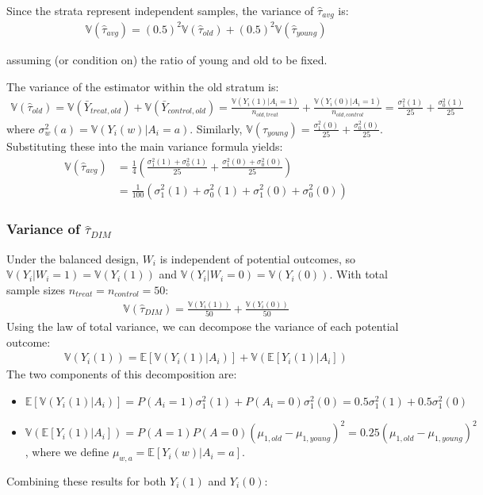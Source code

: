 \documentclass[11pt]{article}
\numberwithin{equation}{section}
\newcommand{\E}{\mathbb{E}}
\newcommand{\Var}{\mathbb{V}}
\begin{document}
Since the strata represent independent samples, the variance of $\hat{\tau}_{avg}$ is:
\begin{align}
\Var(\hat{\tau}_{avg}) = (0.5)^2 \Var(\hat{\tau}_{old}) + (0.5)^2 \Var(\hat{\tau}_{young})
\end{align}

assuming (or condition on) the ratio of young and old to be fixed.

The variance of the estimator within the old stratum is:
\begin{align}
\Var(\hat{\tau}_{old}) = \Var(\bar{Y}_{treat,old}) + \Var(\bar{Y}_{control,old}) = \frac{\Var(Y_i(1)|A_i=1)}{n_{old,treat}} + \frac{\Var(Y_i(0)|A_i=1)}{n_{old,control}} = \frac{\sigma^2_1(1)}{25} + \frac{\sigma^2_0(1)}{25}
\end{align}
where $\sigma^2_w(a) = \Var(Y_i(w)|A_i=a)$. Similarly, $\Var(\hat{\tau}_{young}) = \frac{\sigma^2_1(0)}{25} + \frac{\sigma^2_0(0)}{25}$.
Substituting these into the main variance formula yields:
\begin{align}
\Var(\hat{\tau}_{avg}) &= \frac{1}{4} \left( \frac{\sigma^2_1(1) + \sigma^2_0(1)}{25} + \frac{\sigma^2_1(0) + \sigma^2_0(0)}{25} \right) \\
&= \frac{1}{100} \left( \sigma^2_1(1) + \sigma^2_0(1) + \sigma^2_1(0) + \sigma^2_0(0) \right)
\end{align}

\subsubsection{Variance of \texorpdfstring{$\hat{\tau}_{DIM}$}{tau\_DIM}}

Under the balanced design, $W_i$ is independent of potential outcomes, so $\Var(Y_i|W_i=1) = \Var(Y_i(1))$ and $\Var(Y_i|W_i=0) = \Var(Y_i(0))$. With total sample sizes $n_{treat}=n_{control}=50$:
\begin{align}
\Var(\hat{\tau}_{DIM}) = \frac{\Var(Y_i(1))}{50} + \frac{\Var(Y_i(0))}{50}
\end{align}
Using the law of total variance, we can decompose the variance of each potential outcome:
\begin{align}
\Var(Y_i(1)) = \E[\Var(Y_i(1)|A_i)] + \Var(\E[Y_i(1)|A_i])
\end{align}
The two components of this decomposition are:
\begin{itemize}
    \item $\E[\Var(Y_i(1)|A_i)] = P(A_i=1)\sigma^2_1(1) + P(A_i=0)\sigma^2_1(0) = 0.5\sigma^2_1(1) + 0.5\sigma^2_1(0)$
    \item $\Var(\E[Y_i(1)|A_i]) = P(A=1)P(A=0)(\mu_{1,old} - \mu_{1,young})^2 = 0.25(\mu_{1,old} - \mu_{1,young})^2$, where we define $\mu_{w,a} = \E[Y_i(w)|A_i=a]$.
\end{itemize}
Combining these results for both $Y_i(1)$ and $Y_i(0)$:
\end{document}
